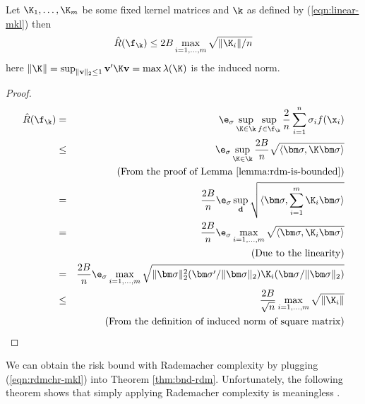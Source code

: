 \begin{theorem} \label{thm:rbd-mkl}
\cite[Theorem 2]{nips/BousquetH02}Let $\K_1, \ldots, \K_m$ be some fixed kernel
matrices and $\k$ as defined by (\ref{eqn:linear-mkl}) then
\begin{equation}
\hat{R}(\f_\k) \leq 2B\max_{i=1,\ldots,m} \sqrt{\| \K_i \| / n}  \label{eqn:rdmchr-mkl}
\end{equation}
here $\|\K\| = \sup_{\| \mathbf v \|_2 \leq 1}\mathbf v' \K \mathbf v = \max
\lambda(\K)$ is the induced norm.
\end{theorem}
\begin{proof}
\begin{eqnarray}
\hat{R}(\f_\k) &=& \e_{\sigma} \sup_{\K \in \k} \sup_{f \in \f_\k} \frac{2}{n} \sum_{i=1}^n \sigma_i f(\x_i) \nonumber\\
&\leq& \e_\sigma \sup_{\K \in \k}\frac{2B}{n} \sqrt{\langle \bm\sigma, \K\bm\sigma \rangle} \nonumber\\
&&\mbox{(From the proof of Lemma \ref{lemma:rdm-is-bounded})} \nonumber\\
&=& \frac{2B}{n} \e_\sigma \sup_{\mathbf d}\sqrt{\langle\bm\sigma, \sum_{i=1}^m\K_i\bm\sigma\rangle}\nonumber\\
&=& \frac{2B}{n} \e_\sigma \max_{i=1,\ldots,m}\sqrt{\langle\bm\sigma, \K_i\bm\sigma\rangle} \nonumber\\
&&\mbox{(Due to the linearity)} \nonumber\\
&=&\frac{2B}{n} \e_\sigma \max_{i=1,\ldots,m} \sqrt{\| \bm\sigma \|_2^2 (\bm\sigma'/\|\bm\sigma\|_2)\K_i(\bm\sigma/\|\bm\sigma\|_2)} \nonumber\\
&\leq& \frac{2B}{\sqrt{n}} \max_{i=1,\ldots,m} \sqrt{\| \K_i \|} \nonumber\\
&&\mbox{(From the definition of induced norm of square matrix)} \nonumber
\end{eqnarray}

\end{proof}

We can obtain the risk bound with Rademacher complexity by plugging
(\ref{eqn:rdmchr-mkl}) into Theorem \ref{thm:bnd-rdm}. Unfortunately, the
following theorem shows that simply applying Rademacher complexity is meaningless \cite{colt/SrebroB06}.

